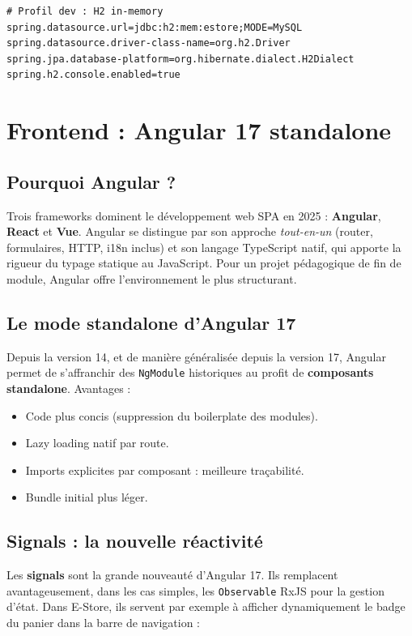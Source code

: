 \documentclass[11pt,a4paper,oneside]{report}
\begin{document}
\begin{lstlisting}[style=propertiesstyle, caption=Extrait de application-dev.properties]
# Profil dev : H2 in-memory
spring.datasource.url=jdbc:h2:mem:estore;MODE=MySQL
spring.datasource.driver-class-name=org.h2.Driver
spring.jpa.database-platform=org.hibernate.dialect.H2Dialect
spring.h2.console.enabled=true
\end{lstlisting}

\section{Frontend : Angular 17 standalone}

\subsection{Pourquoi Angular ?}
Trois frameworks dominent le développement web SPA en 2025 :
\textbf{Angular}, \textbf{React} et \textbf{Vue}. Angular se distingue par
son approche \textit{tout-en-un} (router, formulaires, HTTP, i18n inclus) et
son langage TypeScript natif, qui apporte la rigueur du typage statique au
JavaScript. Pour un projet pédagogique de fin de module, Angular offre
l'environnement le plus structurant.

\subsection{Le mode standalone d'Angular 17}
Depuis la version 14, et de manière généralisée depuis la version 17,
Angular permet de s'affranchir des \texttt{NgModule} historiques au profit
de \textbf{composants standalone}. Avantages :

\begin{itemize}
  \item Code plus concis (suppression du boilerplate des modules).
  \item Lazy loading natif par route.
  \item Imports explicites par composant : meilleure traçabilité.
  \item Bundle initial plus léger.
\end{itemize}

\subsection{Signals : la nouvelle réactivité}
Les \textbf{signals} sont la grande nouveauté d'Angular 17. Ils
remplacent avantageusement, dans les cas simples, les \texttt{Observable}
RxJS pour la gestion d'état. Dans E-Store, ils servent par exemple à
afficher dynamiquement le badge du panier dans la barre de navigation :
\end{document}
